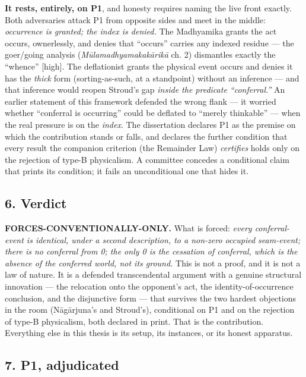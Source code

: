 \documentclass[11pt]{article}
\begin{document}
\textbf{It rests, entirely, on P1}, and honesty requires naming the live front exactly. Both adversaries attack P1 from opposite sides and meet in the middle: \emph{occurrence is granted; the index is denied.} The Madhyamika grants the act occurs, ownerlessly, and denies that ``occurs'' carries any indexed residue — the goer/\allowbreak{}going analysis (\emph{Mūlamadhyamakakārikā} ch. 2) dismantles exactly the ``whence'' [high]. The deflationist grants the physical event occurs and denies it has the \emph{thick} form (sorting-as-such, at a standpoint) without an inference — and that inference would reopen Stroud's gap \emph{inside the predicate ``conferral.''} An earlier statement of this framework defended the wrong flank — it worried whether ``conferral is occurring'' could be deflated to ``merely thinkable'' — when the real pressure is on the \emph{index}. The dissertation declares P1 as the premise on which the contribution stands or falls, and declares the further condition that every result the companion criterion (the Remainder Law) \emph{certifies} holds only on the rejection of type-B physicalism. A committee concedes a conditional claim that prints its condition; it fails an unconditional one that hides it.

\subsection*{6. Verdict}

\textbf{FORCES-CONVENTIONALLY-ONLY.} What is forced: \emph{every conferral-event is identical, under a second description, to a non-zero occupied seam-event; there is no conferral from 0; the only 0 is the cessation of conferral, which is the absence of the conferred world, not its ground.} This is not a proof, and it is not a law of nature. It is a defended transcendental argument with a genuine structural innovation — the relocation onto the opponent's act, the identity-of-occurrence conclusion, and the disjunctive form — that survives the two hardest objections in the room (Nāgārjuna's and Stroud's), conditional on P1 and on the rejection of type-B physicalism, both declared in print. That is the contribution. Everything else in this thesis is its setup, its instances, or its honest apparatus.

\subsection*{7. P1, adjudicated}
\end{document}
